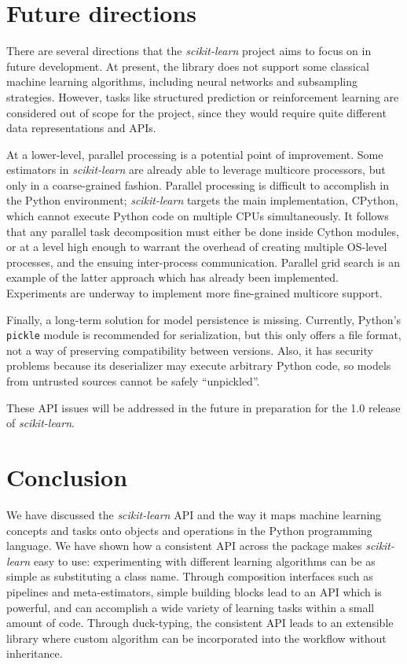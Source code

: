 \documentclass[twocolumn]{article}
\newcommand{\sklearn}{\textit{scikit-learn}\xspace}
\begin{document}
\section{Future directions}
\label{sec:future_work}
There are several directions that the \sklearn project
aims to focus on in future development.
At present, the library does not support some classical machine learning
algorithms,
including neural networks and subsampling strategies.
However, tasks like structured prediction or reinforcement learning are
considered out of scope for the project,
since they would require quite different data representations and APIs.

At a lower-level, parallel processing is a potential point of improvement.
Some estimators in \sklearn are already able to leverage multicore processors,
but only in a coarse-grained fashion.
Parallel processing is difficult to accomplish in the Python environment;
\sklearn targets the main implementation, CPython,
which cannot execute Python code on multiple CPUs simultaneously.
It follows that any parallel task decomposition must either be done
inside Cython modules,
or at a level high enough to warrant the overhead
of creating multiple OS-level processes,
and the ensuing inter-process communication.
Parallel grid search is an example of the latter approach
which has already been implemented.
Experiments are underway to implement more fine-grained multicore support.

Finally, a long-term solution for model persistence is missing.
Currently, Python's \texttt{pickle} module is recommended for serialization,
but this only offers a file format,
not a way of preserving compatibility between versions.
Also, it has security problems because its deserializer
may execute arbitrary Python code,
so models from untrusted sources cannot be safely ``unpickled''.

These API issues will be addressed in the future in preparation for
the 1.0 release of \sklearn.


\section{Conclusion}
\label{sec:conclusions}

We have discussed the \sklearn API
and the way it maps machine learning concepts and tasks
onto objects and operations in the Python programming language.
We have shown how a consistent API across the package makes \sklearn
easy to use: experimenting with different learning
algorithms can be as simple as substituting a class name.
Through composition interfaces such as pipelines and meta-estimators,
simple building blocks lead to an API which is powerful,
and can accomplish a wide variety of learning tasks
within a small amount of code.
Through duck-typing, the consistent API leads to an extensible library
where custom algorithm can be incorporated into the workflow without inheritance.
\end{document}

